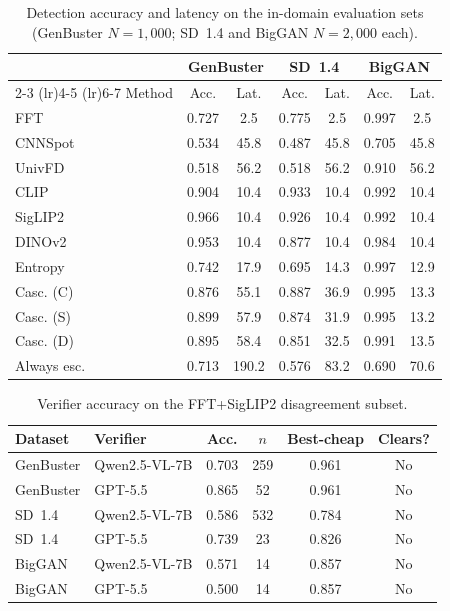 \documentclass{ieeeaccess}
\begin{document}
\begin{table}[h]
\centering
\footnotesize
\setlength{\tabcolsep}{2.5pt}
\caption{Detection accuracy and latency on the in-domain evaluation sets (GenBuster $N{=}1{,}000$; SD~1.4 and BigGAN $N{=}2{,}000$ each).}
\label{tab:main_results}
\begin{tabular}{lcccccc}
\toprule
 & \multicolumn{2}{c}{GenBuster} & \multicolumn{2}{c}{SD~1.4} & \multicolumn{2}{c}{BigGAN} \\
\cmidrule(lr){2-3} \cmidrule(lr){4-5} \cmidrule(lr){6-7}
Method & Acc. & Lat. & Acc. & Lat. & Acc. & Lat. \\
\midrule
FFT          & 0.727 &  2.5 & 0.775 &  2.5 & 0.997 &  2.5 \\
CNNSpot      & 0.534 & 45.8 & 0.487 & 45.8 & 0.705 & 45.8 \\
UnivFD       & 0.518 & 56.2 & 0.518 & 56.2 & 0.910 & 56.2 \\
CLIP         & 0.904 & 10.4 & 0.933 & 10.4 & 0.992 & 10.4 \\
SigLIP2      & 0.966 & 10.4 & 0.926 & 10.4 & 0.992 & 10.4 \\
DINOv2       & 0.953 & 10.4 & 0.877 & 10.4 & 0.984 & 10.4 \\
Entropy      & 0.742 & 17.9 & 0.695 & 14.3 & 0.997 & 12.9 \\
Casc. (C)    & 0.876 & 55.1 & 0.887 & 36.9 & 0.995 & 13.3 \\
Casc. (S)    & 0.899 & 57.9 & 0.874 & 31.9 & 0.995 & 13.2 \\
Casc. (D)    & 0.895 & 58.4 & 0.851 & 32.5 & 0.991 & 13.5 \\
Always esc.  & 0.713 & 190.2 & 0.576 & 83.2 & 0.690 & 70.6 \\
\bottomrule
\end{tabular}
\end{table}
\begin{table}[h]
\centering
\footnotesize
\setlength{\tabcolsep}{2pt}
\caption{Verifier accuracy on the FFT+SigLIP2 disagreement subset.}
\label{tab:verifier_comparison}
\begin{tabular}{llcccc}
\toprule
Dataset & Verifier & Acc. & $n$ & Best-cheap & Clears? \\
\midrule
GenBuster & Qwen2.5-VL-7B  & 0.703 & 259 & 0.961 & No \\
GenBuster & GPT-5.5        & 0.865 &  52 & 0.961 & No \\
\midrule
SD~1.4    & Qwen2.5-VL-7B  & 0.586 & 532 & 0.784 & No \\
SD~1.4    & GPT-5.5        & 0.739 &  23 & 0.826 & No \\
\midrule
BigGAN    & Qwen2.5-VL-7B  & 0.571 &  14 & 0.857 & No \\
BigGAN    & GPT-5.5        & 0.500 &  14 & 0.857 & No \\
\bottomrule
\end{tabular}
\end{table}
\end{document}
